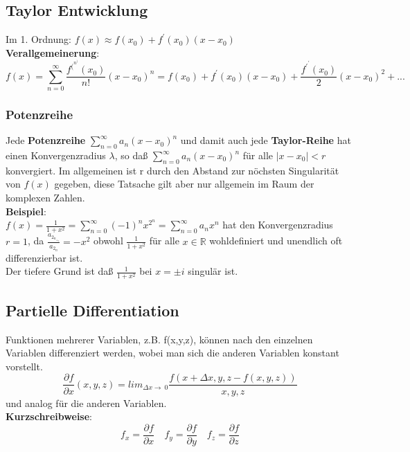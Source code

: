 \documentclass[11pt]{article}
\newcommand{\R}{\mathbb{R}}
\begin{document}
\subsection{Taylor Entwicklung}
	Im 1. Ordnung: $f(x) \approx f(x_0) + f^\prime(x_0)(x-x_0)$\\
\textbf{Verallgemeinerung}:\
	\[ f(x)= \sum_{n=0}^{\infty}\frac{f^(^n^) (x_0)}{n!} (x-x_0)^n = f(x_0) + f^\prime (x_0) (x - x_0) + \frac{f^\prime ^\prime (x_0)}{2} (x-x_0)^2 + ... \]
	\subsubsection{Potenzreihe}
	Jede \textbf{Potenzreihe} 
	$\sum_{n=0}^{\infty}a_n(x-x_0)^n$ und damit auch jede \textbf{Taylor-Reihe} hat einen Konvergenzradius $\lambda$, so daß $\sum_{n=0}^{\infty}a_n(x-x_0)^n$ für alle $|x-x_0| < r$ konvergiert. Im allgemeinen ist r durch den Abstand zur nöchsten Singularität von $f(x)$ gegeben, diese Tatsache gilt aber nur allgemein im Raum der komplexen Zahlen.\\
	\textbf{Beispiel}:\\ 
	$f(x) = \frac{1}{1 + x^2} = \sum_{n=0}^{\infty} (-1)^n x^2^n = \sum_{n=0}^{\infty} a_nx^n $ hat den Konvergenzradius $r = 1$, da $\frac{a_2_n_+_2}{a_2_n} = -x^2$ obwohl $\frac{1}{1+x^2}$ für alle $x \in \R$ wohldefiniert und unendlich oft differenzierbar ist. \\
	Der tiefere Grund ist daß $ \frac{1 }{1 + x^2} $ bei $x = \pm i$ singulär ist. 
	\subsection{Partielle Differentiation}
		Funktionen mehrerer Variablen, z.B. f(x,y,z), können nach den einzelnen Variablen differenziert werden, wobei man sich die anderen Variablen konstant vorstellt.\\
		\[ \frac{\partial f}{\partial x}(x,y,z) =  lim_{\Delta x \to\ 0} \frac{f(x+\Delta x,y,z - f(x,y,z))}{x,y,z} \]
		und analog für die anderen Variablen.\\ \textbf{Kurzschreibweise}:\\
		\[ f_x = \frac{\partial f}{\partial x} \quad f_y = \frac{\partial f}{\partial y} \quad f_z = \frac{\partial f}{\partial z} \] \\
\end{document}
